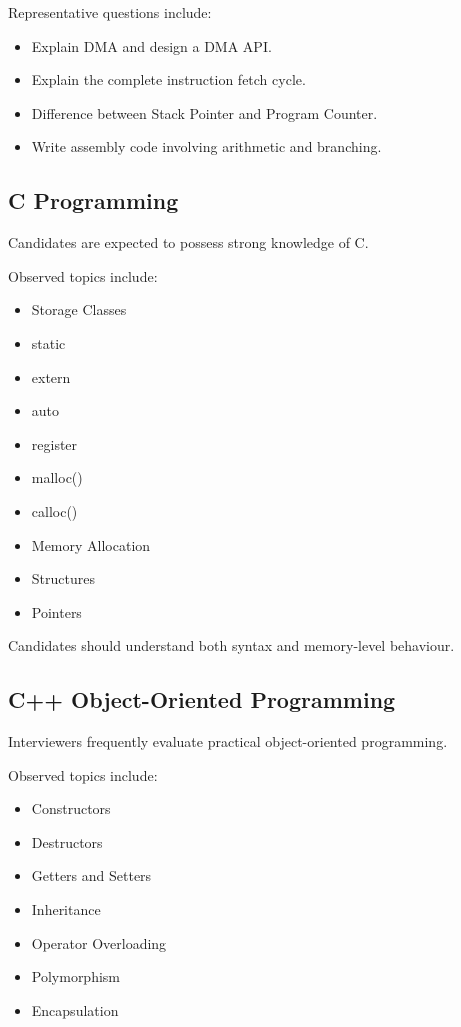 \documentclass[11pt,a4paper]{article}
\begin{document}
Representative questions include:

\begin{itemize}
	\item Explain DMA and design a DMA API.
	\item Explain the complete instruction fetch cycle.
	\item Difference between Stack Pointer and Program Counter.
	\item Write assembly code involving arithmetic and branching.
\end{itemize}


\subsection{C Programming}

Candidates are expected to possess strong knowledge of C.

Observed topics include:

\begin{itemize}
	\item Storage Classes
	\item static
	\item extern
	\item auto
	\item register
	\item malloc()
	\item calloc()
	\item Memory Allocation
	\item Structures
	\item Pointers
\end{itemize}

Candidates should understand both syntax and memory-level behaviour.


\subsection{C++ Object-Oriented Programming}

Interviewers frequently evaluate practical object-oriented programming.

Observed topics include:

\begin{itemize}
	\item Constructors
	\item Destructors
	\item Getters and Setters
	\item Inheritance
	\item Operator Overloading
	\item Polymorphism
	\item Encapsulation
\end{itemize}
\end{document}
